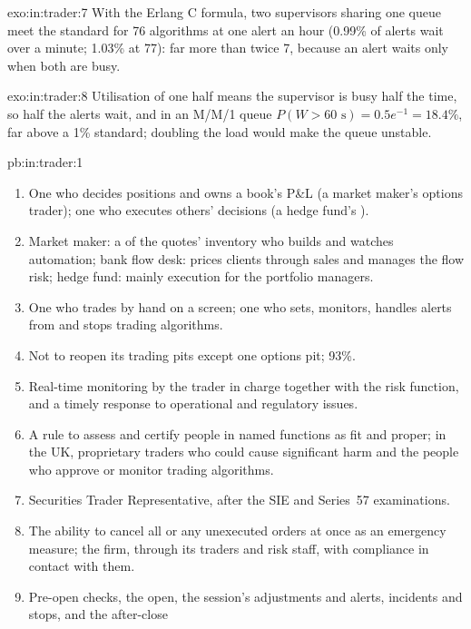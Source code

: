 \begin{solution}{exo:in:trader:7}
With the Erlang C formula, two supervisors sharing one queue meet the standard for 76 algorithms at one alert an hour
(0.99\% of alerts wait over a minute; 1.03\% at 77): far more than twice 7, because an alert waits only when both are busy.
\end{solution}

\begin{solution}{exo:in:trader:8}
Utilisation of one half means the supervisor is busy half the time, so half the alerts wait, and in an M/M/1 queue
$P(W>60\text{ s})=0.5e^{-1}=18.4\%$, far above a 1\% standard; doubling the load would make the queue unstable.
\end{solution}

\begin{solution}{pb:in:trader:1}
\begin{enumerate}
\item One who decides positions and owns a book's P\&L (a market maker's options trader); one who executes others'
decisions (a hedge fund's ).
\item Market maker: a  of the quotes' inventory who builds and watches automation; bank flow desk: prices clients
through sales and manages the flow risk; hedge fund: mainly execution for the portfolio managers.
\item One who trades by hand on a screen; one who sets, monitors, handles alerts from and stops trading algorithms.
\item Not to reopen its trading pits except one options pit; 93\%.
\item Real-time monitoring by the trader in charge together with the risk function, and a timely response to operational
and regulatory issues.
\item A rule to assess and certify people in named functions as fit and proper; in the UK, proprietary traders who could
cause significant harm and the people who approve or monitor trading algorithms.
\item Securities Trader Representative, after the SIE and Series~57 examinations.
\item The ability to cancel all or any unexecuted orders at once as an emergency measure; the firm, through its traders and
risk staff, with compliance in contact with them.
\item Pre-open checks, the open, the session's adjustments and alerts, incidents and stops, and the after-close

\end{enumerate}
\end{solution}
